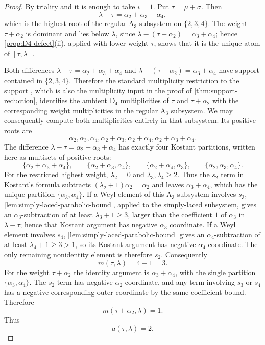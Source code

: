 \documentclass[11pt]{article}
\theoremstyle{definition}
\theoremstyle{remark}
\newcommand{\typeA}{\ensuremath{\mathrm{A}}}
\newcommand{\typeD}{\ensuremath{\mathrm{D}}}
\begin{document}
\begin{proof}
By triality and  it is enough to take $i=1$.  Put $\tau=\mu+\sigma$.  Then
\[
 \lambda-\tau=\alpha_2+\alpha_3+\alpha_4,
\]
which is the highest root of the regular $\typeA_3$ subsystem on
$\{2,3,4\}$.  The weight $\tau+\alpha_2$ is dominant and lies below
$\lambda$, since
$\lambda-(\tau+\alpha_2)=\alpha_3+\alpha_4$; hence
\cref{prop:D4-defect}(ii), applied with lower weight $\tau$, shows that it is
the unique atom of $[\tau,\lambda]$.

Both differences $\lambda-\tau=\alpha_2+\alpha_3+\alpha_4$ and
$\lambda-(\tau+\alpha_2)=\alpha_3+\alpha_4$ have support contained in
$\{2,3,4\}$.  Therefore the
standard multiplicity restriction to the support
\cite[Proposition~2.4(1)]{BZ1}, which is also the multiplicity input in the
proof of \cref{thm:support-reduction}, identifies the ambient $\typeD_4$
multiplicities of $\tau$ and $\tau+\alpha_2$ with the corresponding weight
multiplicities in the regular $\typeA_3$ subsystem.  We may consequently compute
both multiplicities entirely in that subsystem.  Its positive roots are
\[
 \alpha_2,\alpha_3,\alpha_4,
 \alpha_2+\alpha_3,\alpha_2+\alpha_4,
 \alpha_2+\alpha_3+\alpha_4.
\]
The difference $\lambda-\tau=\alpha_2+\alpha_3+\alpha_4$ has exactly four
Kostant partitions, written here as multisets of positive roots:
\[
 \{\alpha_2+\alpha_3+\alpha_4\},\qquad
 \{\alpha_2+\alpha_3,\alpha_4\},\qquad
 \{\alpha_2+\alpha_4,\alpha_3\},\qquad
 \{\alpha_2,\alpha_3,\alpha_4\}.
\]
For the restricted highest weight, $\lambda_2=0$ and
$\lambda_3,\lambda_4\ge2$.  Thus the $s_2$ term in Kostant's formula subtracts
$(\lambda_2+1)\alpha_2=\alpha_2$ and leaves
$\alpha_3+\alpha_4$, which has the unique partition
$\{\alpha_3,\alpha_4\}$.  If a Weyl element of this $\typeA_3$ subsystem involves $s_3$,
\cref{lem:simply-laced-parabolic-bound}, applied to the simply-laced subsystem,
gives an $\alpha_3$-subtraction of at least
$\lambda_3+1\ge3$, larger than the coefficient $1$ of $\alpha_3$ in
$\lambda-\tau$; hence that Kostant argument has negative $\alpha_3$
coordinate.  If a Weyl element involves $s_4$,
\cref{lem:simply-laced-parabolic-bound} gives an
$\alpha_4$-subtraction of at least $\lambda_4+1\ge3>1$, so its Kostant
argument has negative $\alpha_4$ coordinate.  The only remaining nonidentity
element is therefore $s_2$.  Consequently
\[
 m(\tau,\lambda)=4-1=3.
\]
For the weight $\tau+\alpha_2$ the identity argument is
$\alpha_3+\alpha_4$, with the single partition
$\{\alpha_3,\alpha_4\}$.  The $s_2$ term has negative $\alpha_2$ coordinate,
and any term involving $s_3$ or $s_4$ has a negative corresponding outer
coordinate by the same coefficient bound.  Therefore
\[
 m(\tau+\alpha_2,\lambda)=1.
\]
Thus
\begin{equation}\label{eq:D4-minimal-shifted}
             a(\tau,\lambda)=2.
\end{equation}


\end{proof}
\end{document}
